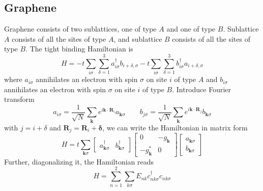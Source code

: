 \documentclass[../../../main.tex]{subfiles}
\begin{document}
\subsection{Graphene}
Graphene consists of two sublattices, one of type $A$ and one of type $B$.
Sublattice $A$ consists of all the sites of type $A$, and sublattice $B$ consists of all the sites of type $B$.
The tight binding Hamiltonian is
\begin{equation*}
  H = -t \sum_{i\sigma}\sum_{\delta=1}^{3} a_{i\sigma}^\dagger b_{i+\delta,\sigma}
  - t \sum_{i\sigma}\sum_{\delta=1}^{3} b_{i\sigma}^\dagger a_{i+\delta,\sigma}
\end{equation*}
where $a_{i \sigma}$ annihilates an electron with spin $\sigma$ on site $i$ of type $A$ and $b_{i \sigma}$ annihilates an electron with spin $\sigma$ on site $i$ of type $B$.
Introduce Fourier transform
\begin{equation*}
  a_{i\sigma} = \frac{1}{\sqrt{N}}\sum_{\mathbf{k}} e^{i\mathbf{k}\cdot\mathbf{R}_i}a_{\mathbf{k}\sigma}
  \qquad
  b_{j\sigma} = \frac{1}{\sqrt{N}}\sum_{\mathbf{k}} e^{i\mathbf{k}\cdot\mathbf{R}_j}b_{\mathbf{k}\sigma}
\end{equation*}
with $j = i + \delta$ and $\mathbf{R}_j = \mathbf{R }_i + \boldsymbol{\delta}$, we can write the Hamiltonian in matrix form 
\begin{equation*}
  H= t\sum_{\mathbf{k}\sigma}
  \begin{bmatrix} a_{\mathbf{k}\sigma}^\dagger & b_{\mathbf{k}\sigma}^\dagger \end{bmatrix}
  \begin{bmatrix} 0 & - g_\mathbf{k} \\ - g_\mathbf{k}^* & 0 \end{bmatrix}
  \begin{bmatrix} a_{\mathbf{k}\sigma} \\ b_{\mathbf{k}\sigma} \end{bmatrix}  
\end{equation*}
Further, diagonalizing it, the Hamiltonian reads 
\begin{equation*}
    H = \sum_{n=1}^{2}\sum_{k\sigma} E_{n k} c_{n k \sigma}^{\dagger} c_{n k \sigma}
\end{equation*}
\end{document}
